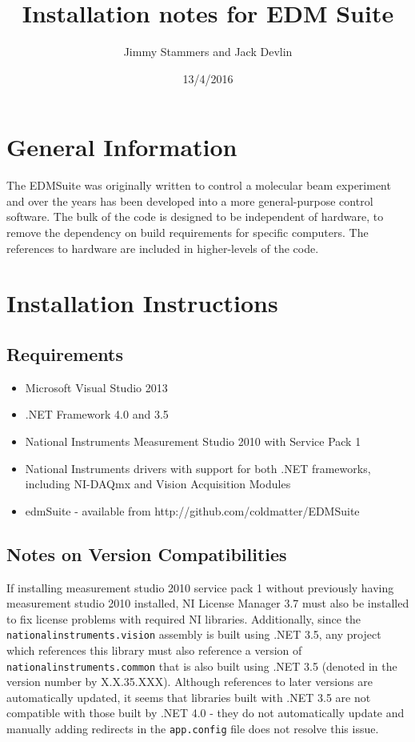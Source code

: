 \documentclass{article}
\title{Installation notes for EDM Suite }
\author{Jimmy Stammers and Jack Devlin}
\date{13/4/2016}
\begin{document}
\maketitle
\section{General Information}
The EDMSuite was originally written to control a molecular beam experiment and over the years has been developed into a more general-purpose control software. The bulk of the code is designed to be independent of hardware, to remove the dependency on build requirements for specific computers. The references to hardware are included in higher-levels of the code.
\section{Installation Instructions}
\subsection{Requirements}
\begin{itemize}
\item Microsoft Visual Studio 2013
\item .NET Framework 4.0 and 3.5
\item National Instruments Measurement Studio 2010 with Service Pack 1
\item National Instruments drivers with support for both .NET frameworks, including NI-DAQmx and Vision Acquisition Modules
\item edmSuite - available from http://github.com/coldmatter/EDMSuite
\end{itemize}
\subsection{Notes on Version Compatibilities}
If installing measurement studio 2010 service pack 1 without previously having measurement studio 2010 installed, NI License Manager 3.7 must also be installed to fix license problems with required NI libraries. Additionally, since the \lstinline|nationalinstruments.vision| assembly is built using .NET 3.5, any project which references this library must also reference a version of \lstinline|nationalinstruments.common| that is also built using .NET 3.5 (denoted in the version number by X.X.35.XXX). Although references to later versions are automatically updated, it seems that libraries built with .NET 3.5 are not compatible with those built by .NET 4.0 - they do not automatically update and manually adding redirects in the \lstinline|app.config| file does not resolve this issue.
\end{document}
